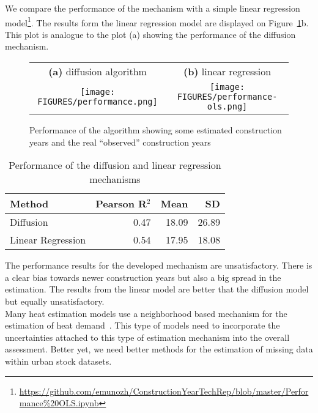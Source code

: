 We compare the performance of the mechanism with a simple linear regression
model\footnote{\url{https://github.com/emunozh/ConstructionYearTechRep/blob/master/Performance\%20OLS.ipynb}}.
The results form the linear regression model are displayed on
Figure~\ref{fig:performance}b. This plot is analogue to the plot (a) showing
the performance of the diffusion mechanism.\\

\begin{figure}[htpb]
    \centering
    \begin{tabular}{cc}
        \textbf{(a)} diffusion algorithm&
        \textbf{(b)} linear regression\\
    \texttt{[image: FIGURES/performance.png]}&
    \texttt{[image: FIGURES/performance-ols.png]}\\
    \end{tabular}
    \caption{Performance of the algorithm showing some estimated construction
        years and the real ``observed'' construction years
}\label{fig:performance}
\end{figure}

\begin{table}[htb]
    \centering
    \caption{Performance of the diffusion and linear regression
    mechanisms}\label{tab:performance}
    \begin{tabular}{lrrr}
        \toprule
        \textbf{Method} & \textbf{Pearson R$^2$} &
        \textbf{Mean} & \textbf{SD}\\
        \midrule
        Diffusion           & 0.47 & 18.09 & 26.89\\
        Linear Regression   & 0.54 & 17.95 & 18.08\\
        \bottomrule
    \end{tabular}
\end{table}

The performance results for the developed mechanism are unsatisfactory. There
is a clear bias towards newer construction years but also a big spread in the
estimation. The results from the linear model are better that the diffusion
model but equally unsatisfactory.\\

Many heat estimation models use a neighborhood based mechanism for the
estimation of heat
demand~\cite{Hermelink.2011,MunozH.2011.msc,MunozH.2015.MEQ,MunozH.2014.IJM}.
This type of models need to incorporate the uncertainties attached to this type
of estimation mechanism into the overall assessment. Better yet, we need better
methods for the estimation of missing data within urban stock datasets.\\

